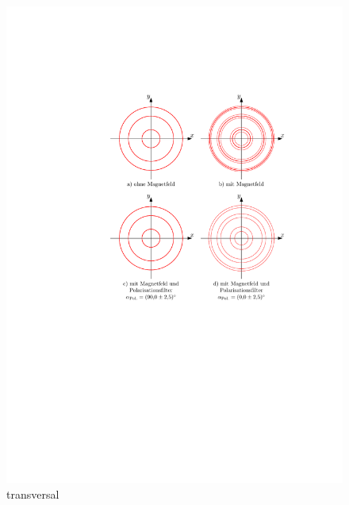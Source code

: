 \documentclass[11pt, a4paper]{article}
\begin{document}
\begin{figure}[h]
	\centering
	\includegraphics[width=1.0\textwidth]{./figures/zeeman_transversal.pdf}
	\caption{transversal}
	\label{fig:zeeman_transversal}
\end{figure}
\end{document}
